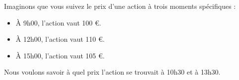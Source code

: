 \documentclass[preview]{standalone}
\begin{document}
\begin{center}
Imaginons que vous suivez le prix d'une action à trois moments spécifiques :
            \begin{itemize}
                \item À 9h00, l'action vaut 100 €.
                \item À 12h00, l'action vaut 110 €.
                \item À 15h00, l'action vaut 105 €.
            \end{itemize}
            Nous voulons savoir à quel prix l'action se trouvait à 10h30 et à 13h30.
\end{center}
\end{document}
